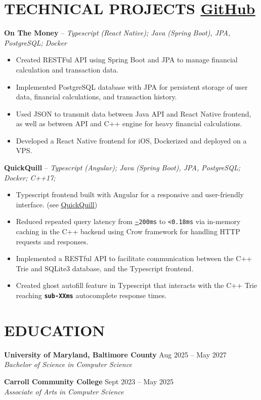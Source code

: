 \documentclass[11pt]{article}
\begin{document}
\section*{
TECHNICAL PROJECTS 
{\normalfont\normalsize\color{black}\underline{\href{https://github.com/nickczak}{GitHub}}}
}
\noindent\textbf{On The Money} -- \textit{Typescript (React Native); Java (Spring Boot), JPA, PostgreSQL; Docker}
\vspace{-2pt} %
\begin{itemize}[label=\texttt{\textbf{>}}]
  \item Created RESTFul API using Spring Boot and JPA to manage financial calculation and transaction data.
  \item Implemented PostgreSQL database with JPA for persistent storage of user data, financial calculations, and transaction history.
  \item Used JSON to transmit data between Java API and React Native frontend, as well as between API and C++ engine for heavy financial calculations.
  \item Developed a React Native frontend for iOS, Dockerized and deployed on a VPS.
\end{itemize} 

\noindent\textbf{QuickQuill} -- \textit{Typescript (Angular); Java (Spring Boot), JPA, PostgreSQL; Docker; C++17;}
\vspace{-2pt} %
\begin{itemize}[label=\texttt{\textbf{>}}]
  \item Typescript frontend built with Angular for a responsive and user-friendly interface. (see \underline{\href{https://quickquill.ink/}{QuickQuill}})
  \item Reduced repeated query latency from \url{~}\texttt{200ms} to \texttt{<0.18ms} via in-memory caching in the C++ backend using Crow framework for handling HTTP requests and responses.
  \item Implemented a RESTful API to facilitate communication between the C++ Trie and SQLite3 database, and the Typescript frontend.
  \item Created ghost autofill feature in Typescript that interacts with the C++ Trie reaching \texttt{\textbf{sub-XXms}} autocomplete response times.
\end{itemize} 

\section*{EDUCATION}
\textbf{University of Maryland, Baltimore County} \hfill Aug 2025 -- May 2027\\
\textit{Bachelor of Science in Computer Science}

\textbf{Carroll Community College} \hfill Sept 2023 -- May 2025\\
\textit{Associate of Arts in Computer Science}
\end{document}
